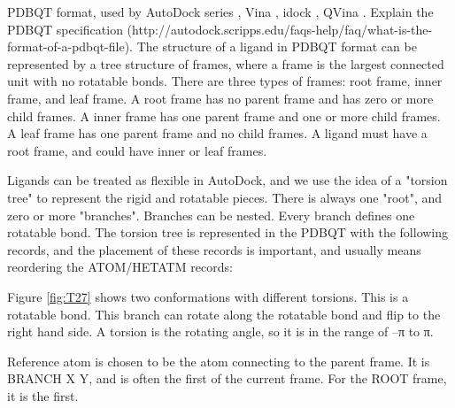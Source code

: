 \documentclass[twocolumn]{svjour3}          %
\begin{document}
PDBQT format, used by AutoDock series \cite{597,596}, Vina \cite{595}, idock \cite{1153}, QVina \cite{1193}. Explain the PDBQT specification (http://autodock.scripps.edu/faqs-help/faq/what-is-the-format-of-a-pdbqt-file).  The structure of a ligand in PDBQT format can be represented by a tree structure of frames, where a frame is the largest connected unit with no rotatable bonds. There are three types of frames: root frame, inner frame, and leaf frame. A root frame has no parent frame and has zero or more child frames. A inner frame has one parent frame and one or more child frames. A leaf frame has one parent frame and no child frames. A ligand must have a root frame, and could have inner or leaf frames.

Ligands can be treated as flexible in AutoDock, and we use the idea of a "torsion tree" to represent the rigid and rotatable pieces. There is always one "root", and zero or more "branches". Branches can be nested. Every branch defines one rotatable bond. The torsion tree is represented in the PDBQT with the following records, and the placement of these records is important, and usually means reordering the ATOM/HETATM records:

Figure \ref{fig:T27} shows two conformations with different torsions. This is a rotatable bond. This branch can rotate along the rotatable bond and flip to the right hand side. A torsion is the rotating angle, so it is in the range of –π to π. 

Reference atom is chosen to be the atom connecting to the parent frame. It is BRANCH X Y, and is often the first of the current frame. For the ROOT frame, it is the first.
\end{document}
